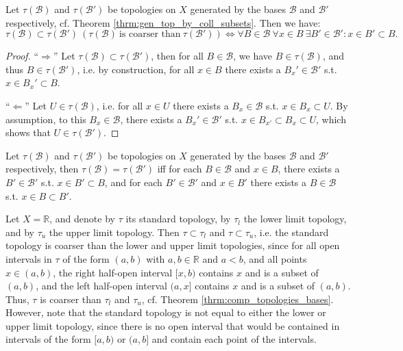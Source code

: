 \begin{theorem}\label{thrm:comp_topologies_bases}
	Let $\tau(\mathscr B)$ and $\tau(\mathscr B')$ be topologies on $X$ generated by the bases $\mathscr B$ and $\mathscr B'$ respectively, cf. Theorem \ref{thrm:gen_top_by_coll_subsets}. Then we have:
	$$\tau(\mathscr B)\subset \tau(\mathscr B') \ (\tau(\mathscr B)\ \text{is coarser than}\ \tau(\mathscr B')) \Leftrightarrow \forall B\in\mathscr B\ \forall x\in B\ \exists B'\in\mathscr B': x\in B'\subset B.$$
\end{theorem}

\begin{proof}
	\enquote{$\Longrightarrow$} Let $\tau(\mathscr B)\subset \tau(\mathscr B')$, then for all $B\in\mathscr B$, we have $B\in\tau(\mathscr B)$, and thus $B\in \tau(\mathscr B')$, i.e. by construction, for all $x\in B$ there exists a $B_x'\in\mathscr B'$ s.t. $x\in B_x'\subset B$.
	
	\enquote{$\Longleftarrow$} Let $U\in\tau(\mathscr B)$, i.e. for all $x\in U$ there exists a $B_x\in \mathscr B$ s.t. $x\in B_x\subset U$. By assumption, to this $B_x\in\mathscr B$, there exists a $B_x'\in\mathscr B'$ s.t. $x\in B_{x'} \subset B_x\subset U$, which shows that $U\in\tau(\mathscr B')$.
\end{proof} 

\begin{corollary}\label{corollary:equality_of_topologies}
	Let $\tau(\mathscr B)$ and $\tau(\mathscr B')$ be topologies on $X$ generated by the bases $\mathscr B$ and $\mathscr B'$ respectively, then $\tau(\mathscr B) = \tau(\mathscr B')$ iff for each $B\in \mathscr B$ and $x\in B$, there exists a $B'\in\mathscr B'$ s.t. $x\in B'\subset B$, and for each $B'\in \mathscr B'$ and $x\in B'$ there exists a $B\in\mathscr B$ s.t. $x\in B\subset B'$.
\end{corollary}

\begin{remark}
	Let $X = \mathbb R$, and denote by $\tau$ its standard topology, by $\tau_l$ the lower limit topology, and by $\tau_u$ the upper limit topology. Then $\tau\subset \tau_l$ and $\tau\subset \tau_u$, i.e. the standard topology is coarser than the lower and upper limit topologies, since for all open intervals in $\tau$ of the form $(a, b)$ with $a, b\in\mathbb R$ and $a < b$, and all points $x\in (a, b)$, the right half-open interval $[x, b)$ contains $x$ and is a subset of $(a, b)$, and the left half-open interval $(a, x]$ contains $x$ and is a subset of $(a, b)$. Thus, $\tau$ is coarser than $\tau_l$ and $\tau_u$, cf. Theorem \ref{thrm:comp_topologies_bases}. However, note that the standard topology is not equal to either the lower or upper limit topology, since there is no open interval that would be contained in intervals of the form $[a, b)$ or $(a, b]$ and contain each point of the intervals.
\end{remark}

